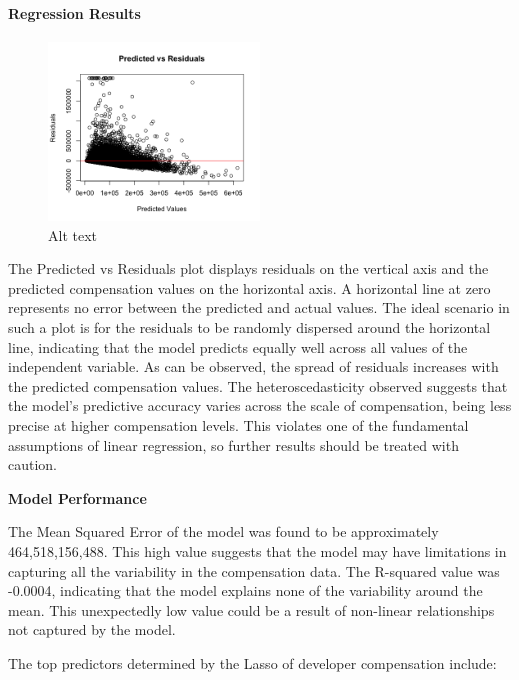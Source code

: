 \documentclass[
  12pt,
]{article}
\begin{document}
\hypertarget{regression-results}{%
\paragraph{Regression Results}\label{regression-results}}

\begin{figure}
\centering
\includegraphics[width=0.5\textwidth,height=0.5\textheight]{predicted_vs_residuals.png}
\caption{Alt text}
\end{figure}

The Predicted vs Residuals plot displays residuals on the vertical axis
and the predicted compensation values on the horizontal axis. A
horizontal line at zero represents no error between the predicted and
actual values. The ideal scenario in such a plot is for the residuals to
be randomly dispersed around the horizontal line, indicating that the
model predicts equally well across all values of the independent
variable. As can be observed, the spread of residuals increases with the
predicted compensation values. The heteroscedasticity observed suggests
that the model's predictive accuracy varies across the scale of
compensation, being less precise at higher compensation levels. This
violates one of the fundamental assumptions of linear regression, so
further results should be treated with caution.

\textbf{Model Performance}

The Mean Squared Error of the model was found to be approximately
464,518,156,488. This high value suggests that the model may have
limitations in capturing all the variability in the compensation data.
The R-squared value was -0.0004, indicating that the model explains none
of the variability around the mean. This unexpectedly low value could be
a result of non-linear relationships not captured by the model.

The top predictors determined by the Lasso of developer compensation
include:
\end{document}
